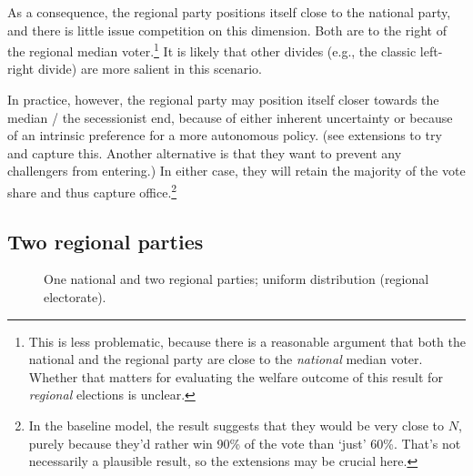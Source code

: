 \documentclass[11pt]{article}
\begin{document}
As a consequence, the regional party positions itself close to the national party, and there is little issue competition on this dimension. Both are to the right of the regional median voter.\footnote{This is less problematic, because there is a reasonable argument that both the national and the regional party are close to the \textit{national} median voter. Whether that matters for evaluating the welfare outcome of this result for \textit{regional} elections is unclear.} It is likely that other divides (e.g., the classic left-right divide) are more salient in this scenario.

In practice, however, the regional party may position itself closer towards the median / the secessionist end, because of either inherent uncertainty or because of an intrinsic preference for a more autonomous policy. (see extensions to try and capture this. Another alternative is that they want to prevent any challengers from entering.) In either case, they will retain the majority of the vote share and thus capture office.\footnote{In the baseline model, the result suggests that they would be very close to $N$, purely because they'd rather win 90\% of the vote than `just' 60\%. That's not necessarily a plausible result, so the extensions may be crucial here.}

\subsection{Two regional parties}

\begin{figure}[ht]
    \centering 
     \caption{One national and two regional parties; uniform distribution (regional electorate).} \label{fig:mod1}
 \end{figure}
\end{document}
